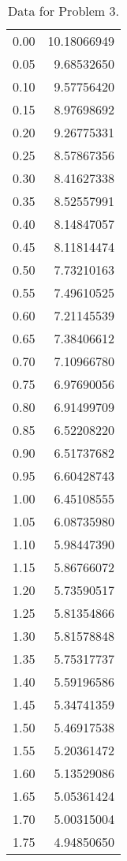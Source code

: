 \documentclass[
    number={9},
    title={Epidemics}
]{math486homework}
\begin{document}
\begin{table}[H]
	\centering
	\caption{Data for Problem 3.}
	\label{tab:prb-3-data}
	\begin{tabular}{c r}
        0.00 & 10.18066949\\
        0.05 & 9.68532650\\
        0.10 & 9.57756420\\
        0.15 & 8.97698692\\
        0.20 & 9.26775331\\
        0.25 & 8.57867356\\
        0.30 & 8.41627338\\
        0.35 & 8.52557991\\
        0.40 & 8.14847057\\
        0.45 & 8.11814474\\
        0.50 & 7.73210163\\
        0.55 & 7.49610525\\
        0.60 & 7.21145539\\
        0.65 & 7.38406612\\
        0.70 & 7.10966780\\
        0.75 & 6.97690056\\
        0.80 & 6.91499709\\
        0.85 & 6.52208220\\
        0.90 & 6.51737682\\
        0.95 & 6.60428743\\
        1.00 & 6.45108555\\
        1.05 & 6.08735980\\
        1.10 & 5.98447390\\
        1.15 & 5.86766072\\
        1.20 & 5.73590517\\
        1.25 & 5.81354866\\
        1.30 & 5.81578848\\
        1.35 & 5.75317737\\
        1.40 & 5.59196586\\
        1.45 & 5.34741359\\
        1.50 & 5.46917538\\
        1.55 & 5.20361472\\
        1.60 & 5.13529086\\
        1.65 & 5.05361424\\
        1.70 & 5.00315004\\
        1.75 & 4.94850650\\

\end{tabular}
\end{table}
\end{document}
